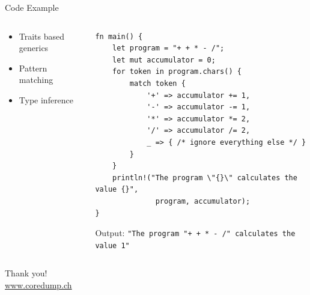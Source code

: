 \documentclass[aspectratio=1610,t]{beamer}
\begin{document}
\begin{frame}[c,fragile]{Code Example}
  \begin{columns}
    \begin{column}{.3\textwidth}
      \centering
      \begin{itemize}
        \item Traits based generics
        \item Pattern matching
        \item Type inference
      \end{itemize}
    \end{column}

    \begin{column}{.8\textwidth}
    \begin{verbatim}
fn main() {
    let program = "+ + * - /";
    let mut accumulator = 0;
    for token in program.chars() {
        match token {
            '+' => accumulator += 1,
            '-' => accumulator -= 1,
            '*' => accumulator *= 2,
            '/' => accumulator /= 2,
            _ => { /* ignore everything else */ }
        }
    }
    println!("The program \"{}\" calculates the value {}",
              program, accumulator);
}
  \end{verbatim}
      Output: \texttt{"The program "+ + * - /" calculates the value 1"}
  \end{column}
  \end{columns}
\end{frame}




{
\begin{frame}[standout]
  \begin{centering}
    {\Huge Thank you!}\\
    {\normalsize \url{www.coredump.ch}}\\
  \end{centering}
\end{frame}
}
\end{document}
